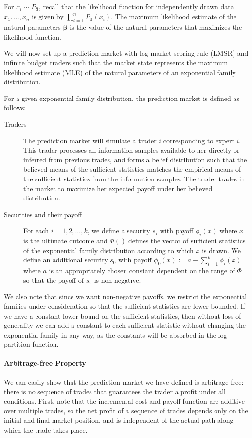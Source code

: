 \documentclass{article}
\newcommand{\betavec}{\pmb{\beta}}
\begin{document}
For $x_{i}\sim P_{\betavec}$, recall that the likelihood function for independently drawn data $x_1,\ldots,x_n$ is given by $\prod_{i=1}^{n} P_{\betavec}(x_i)$. The maximum likelihood estimate of the natural parameters $\betavec$ is the value of the natural parameters that maximizes the likelihood function. 

We will now set up a prediction market with log market scoring rule (LMSR) and infinite budget traders such that the market state represents the maximum likelihood estimate (MLE) of the natural parameters of an exponential family distribution. %

For a given exponential family distribution, the prediction market is defined as follows:
\begin{description}
\item[Traders] The prediction market will simulate a trader $i$ corresponding to expert $i$. This trader processes all information samples available to her directly or inferred from previous trades, and  forms a belief distribution such that the believed means of the sufficient statistics matches the empirical means of the sufficient statistics from the information samples. The trader trades in the market to maximize her expected payoff under her believed distribution.
\item[Securities and their payoff]
For each $i=1,2,\ldots,k$, we define a security $s_{i}$ with payoff $\phi_{i}(x)$ where $x$ is the ultimate outcome and $\Phi()$ defines the vector of sufficient statistics of the exponential family distribution according to which $x$ is drawn. We define an additional security $s_{0}$ with payoff $\phi_{0}(x):=a-\sum_{i=1}^{k}\phi_{i}(x)$ where $a$ is an appropriately chosen constant dependent on the range of $\Phi$ so that the payoff of $s_{0}$ is non-negative. 
\end{description}

We also note that since we want non-negative payoffs, we restrict the exponential families under consideration so that the sufficient statistics are lower bounded. If we have a constant lower bound on the sufficient statistics, then without loss of generality we can add a constant to each sufficient statistic without changing the exponential family in any way, as the constants will be absorbed in the log-partition function.

\paragraph{Arbitrage-free Property}
We can easily show that the prediction market we have defined is arbitrage-free: there is no sequence of trades that guarantees the trader a profit under all conditions. First, note that the incremental cost and payoff function are additive over multiple trades, so the net profit of a sequence of trades depends only on the initial and final market position, and is independent of the actual path along which the trade takes place.
\end{document}
